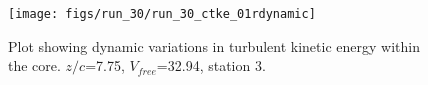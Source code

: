 \begin{figure}[H]
\centering
\texttt{[image: figs/run\_30/run\_30\_ctke\_01rdynamic]}
\caption{Plot showing dynamic variations in turbulent kinetic energy within the core. $z/c$=7.75, $V_{free}$=32.94, station 3.}
\label{fig:run_30_ctke_01rdynamic}
\end{figure}



